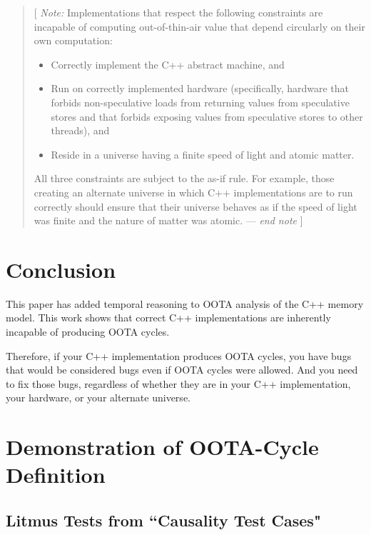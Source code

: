 \documentclass[10]{article}
\begin{document}
\begin{quote}
	[ \emph{Note:} Implementations that respect the following
	constraints are incapable of computing out-of-thin-air value
	that depend circularly on their own computation:

	\begin{itemize}
	\item	Correctly implement the C++ abstract machine, and
	\item	Run on correctly implemented hardware
		(specifically, hardware that forbids non-speculative
		loads from returning values from speculative stores
		and that forbids exposing values from speculative
		stores to other threads), and
	\item	Reside in a universe having a finite speed of light
		and atomic matter.
	\end{itemize}

	All three constraints are subject to the as-if rule.
	For example, those creating an alternate universe in which
	C++ implementations are to run correctly should ensure
	that their universe behaves as if the speed of light was
	finite and the nature of matter was atomic.
	--- \emph{end note} ]
\end{quote}

\section{Conclusion}
\label{sec:Conclusion}

This paper has added temporal reasoning to OOTA analysis of the C++
memory model.
This work shows that correct C++ implementations are inherently incapable
of producing OOTA cycles.

Therefore, if your C++ implementation produces OOTA cycles, you have
bugs that would be considered bugs even if OOTA cycles were allowed.
And you need to fix those bugs, regardless of whether they are in your
C++ implementation, your hardware, or your alternate universe.


\appendix

\section{Demonstration of OOTA-Cycle Definition}
\label{app:Demonstration of OOTA-Cycle Definition}

\subsection{Litmus Tests from “Causality Test Cases"}
\label{app:Litmus Tests from “Causality Test Cases"}
\end{document}
